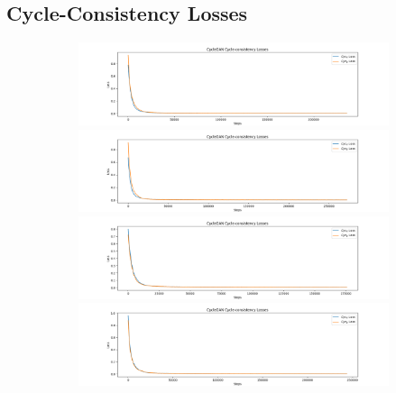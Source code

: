 \documentclass[12pt, fleqn, titlepage]{article}
\begin{document}
\subsection{Cycle-Consistency Losses}\label{cycle_loss}
\begin{figure}[H]
	\centering
	\begin{subfigure}[b]{0.8\textwidth}
		\centering
		\includegraphics[width=\linewidth]{imgs/cycle_losses/XY_model_cycle_losses}
		\hfill
		\includegraphics[width=\linewidth]{imgs/cycle_losses/XZ_model_cycle_losses}
		\hfill
		\includegraphics[width=\linewidth]{imgs/cycle_losses/YZ_model_cycle_losses}
		\hfill
		\includegraphics[width=\linewidth]{imgs/cycle_losses/ALL_model_cycle_losses}
	\end{subfigure}
\end{figure}
\end{document}
